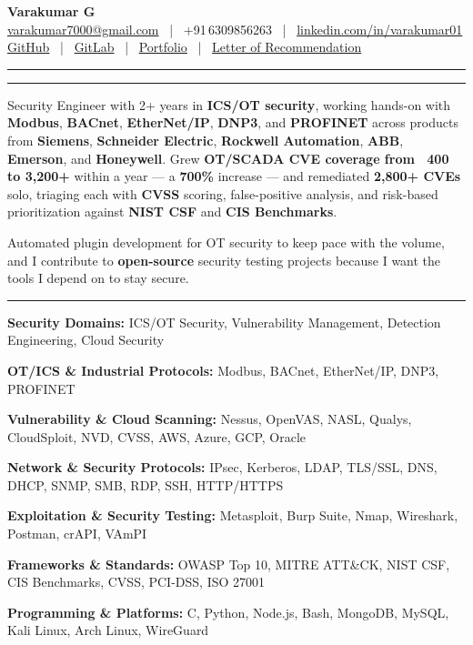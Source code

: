 \documentclass[9pt,a4paper]{extarticle}
\newcommand{\resumeSection}[1]{%
  \vspace{5pt}%
  \noindent{\large\bfseries\MakeUppercase{#1}}\par%
  \vspace{-7pt}%
  \noindent\rule{\textwidth}{0.5pt}%
  \par\vspace{0pt}%
}
\newcommand{\techrow}[2]{\noindent\textbf{#1} #2\par}
\begin{document}

\vspace*{-8pt}
\begin{center}
  {\LARGE\bfseries Varakumar G}\\[2pt]
  \href{mailto:varakumar7000@gmail.com}{varakumar7000@gmail.com}
  ~|~ +91\,6309856263
  ~|~ \href{https://www.linkedin.com/in/varakumar01}{linkedin.com/in/varakumar01}\\[1pt]
  \href{https://github.com/varakumar01}{GitHub}
  ~|~ \href{https://gitlab.com/Tony_01}{GitLab}
  ~|~ \href{https://portfolio.dragnux.com}{Portfolio}
  ~|~ \href{https://drive.google.com/file/d/17c5RtAgWn5TdRQUxnDIvLQogPoUoxgO_/view?pli=1}{Letter of Recommendation}
\end{center}
\vspace{-1pt}\noindent\rule{\textwidth}{0.7pt}

\resumeSection{Professional Summary}

Security Engineer with 2+ years in \textbf{ICS/OT security}, working hands-on with \textbf{Modbus}, \textbf{BACnet}, \textbf{EtherNet/IP}, \textbf{DNP3}, and \textbf{PROFINET} across products from \textbf{Siemens}, \textbf{Schneider Electric}, \textbf{Rockwell Automation}, \textbf{ABB}, \textbf{Emerson}, and \textbf{Honeywell}. Grew \textbf{OT/SCADA CVE coverage from ~400 to 3,200+} within a year — a \textbf{700\%} increase — and remediated \textbf{2,800+ CVEs} solo, triaging each with \textbf{CVSS} scoring, false-positive analysis, and risk-based prioritization against \textbf{NIST CSF} and \textbf{CIS Benchmarks}.

Automated plugin development for OT security to keep pace with the volume, and I contribute to \textbf{open-source} security testing projects because I want the tools I depend on to stay secure.

\resumeSection{Technical Skills}

\techrow{Security Domains:}{ICS/OT Security, Vulnerability Management, Detection Engineering, Cloud Security}
\techrow{OT/ICS \& Industrial Protocols:}{Modbus, BACnet, EtherNet/IP, DNP3, PROFINET}
\techrow{Vulnerability \& Cloud Scanning:}{Nessus, OpenVAS, NASL, Qualys, CloudSploit, NVD, CVSS, AWS, Azure, GCP, Oracle}
\techrow{Network \& Security Protocols:}{IPsec, Kerberos, LDAP, TLS/SSL, DNS, DHCP, SNMP, SMB, RDP, SSH, HTTP/HTTPS}
\techrow{Exploitation \& Security Testing:}{Metasploit, Burp Suite, Nmap, Wireshark, Postman, crAPI, VAmPI}
\techrow{Frameworks \& Standards:}{OWASP Top 10, MITRE ATT\&CK, NIST CSF, CIS Benchmarks, CVSS, PCI-DSS, ISO 27001}
\techrow{Programming \& Platforms:}{C, Python, Node.js, Bash, MongoDB, MySQL, Kali Linux, Arch Linux, WireGuard}
\end{document}
